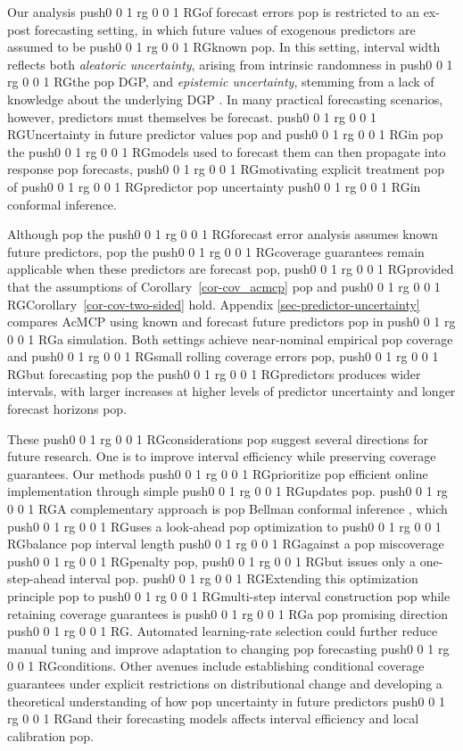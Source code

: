 \documentclass[
  american,
  12pt]{article}
\theoremstyle{plain}
\theoremstyle{plain}
\theoremstyle{remark}
\newcommand{\CPTSadd}[1]{\ifmmode\else\leavevmode\fi\pdfcolorstack 0 push{0 0 1 rg 0 0 1 RG}#1\pdfcolorstack 0 pop}
\begin{document}
Our analysis \CPTSadd{of forecast errors} is restricted to an ex-post forecasting
setting, in which future values of exogenous predictors are assumed to
be \CPTSadd{known}. In this setting, interval width reflects both \emph{aleatoric
uncertainty}, arising from intrinsic randomness in \CPTSadd{the} DGP, and
\emph{epistemic uncertainty}, stemming from a lack of knowledge about
the underlying DGP \citep{sale2025}. In many practical forecasting
scenarios, however, predictors must themselves be forecast. \CPTSadd{Uncertainty
in future predictor values} and \CPTSadd{in} the \CPTSadd{models used to forecast them can
then propagate into response} forecasts, \CPTSadd{motivating explicit treatment} of
\CPTSadd{predictor} uncertainty \CPTSadd{in conformal inference.

Although} the \CPTSadd{forecast error analysis assumes known future predictors,}
the \CPTSadd{coverage guarantees remain applicable when these predictors are
forecast}, \CPTSadd{provided that the assumptions of Corollary~\ref{cor-cov_acmcp}}
and \CPTSadd{Corollary~\ref{cor-cov-two-sided} hold. Appendix
\ref{sec-predictor-uncertainty} compares AcMCP using known and forecast
future predictors} in \CPTSadd{a simulation. Both settings achieve near-nominal
empirical} coverage and \CPTSadd{small rolling coverage errors}, \CPTSadd{but forecasting}
the \CPTSadd{predictors produces wider intervals, with larger increases at higher
levels of predictor uncertainty and longer forecast horizons}.

These \CPTSadd{considerations} suggest several directions for future research. One
is to improve interval efficiency while preserving coverage guarantees.
Our methods \CPTSadd{prioritize} efficient online implementation through simple
\CPTSadd{updates}. \CPTSadd{A complementary approach is} Bellman conformal inference
\citep{yang2024ts}, which \CPTSadd{uses a look-ahead} optimization to \CPTSadd{balance}
interval length \CPTSadd{against a} miscoverage \CPTSadd{penalty}, \CPTSadd{but issues only a
one-step-ahead interval}. \CPTSadd{Extending this optimization principle} to
\CPTSadd{multi-step interval construction} while retaining coverage guarantees is
\CPTSadd{a} promising direction\CPTSadd{. Automated learning-rate selection could further
reduce manual tuning and improve adaptation to changing} forecasting
\CPTSadd{conditions. Other avenues include establishing conditional coverage
guarantees under explicit restrictions on distributional change and
developing a theoretical understanding of how} uncertainty in future
predictors \CPTSadd{and their forecasting models affects interval efficiency and
local calibration}.
\end{document}
